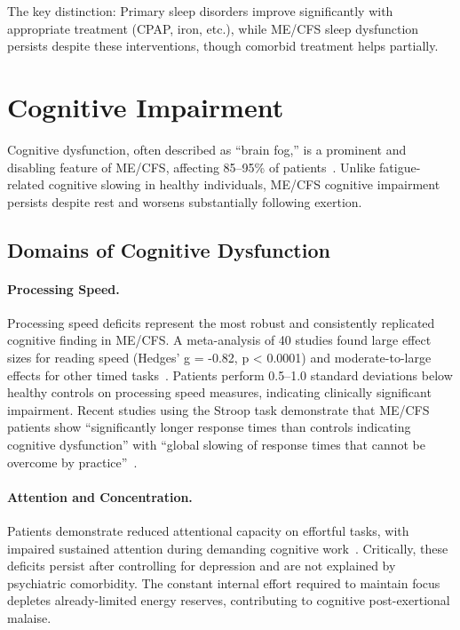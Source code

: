 The key distinction: Primary sleep disorders improve significantly with appropriate treatment (CPAP, iron, etc.), while ME/CFS sleep dysfunction persists despite these interventions, though comorbid treatment helps partially.

\section{Cognitive Impairment}
\label{sec:cognitive}

Cognitive dysfunction, often described as ``brain fog,'' is a prominent and disabling feature of ME/CFS, affecting 85--95\% of patients~\cite{Cvejic2022cognitive}. Unlike fatigue-related cognitive slowing in healthy individuals, ME/CFS cognitive impairment persists despite rest and worsens substantially following exertion.

\subsection{Domains of Cognitive Dysfunction}
\label{subsec:cognitive-domains}

\paragraph{Processing Speed.}
Processing speed deficits represent the most robust and consistently replicated cognitive finding in ME/CFS. A meta-analysis of 40 studies found large effect sizes for reading speed (Hedges' g = -0.82, p < 0.0001) and moderate-to-large effects for other timed tasks~\cite{Cvejic2022cognitive}. Patients perform 0.5--1.0 standard deviations below healthy controls on processing speed measures, indicating clinically significant impairment. Recent studies using the Stroop task demonstrate that ME/CFS patients show ``significantly longer response times than controls indicating cognitive dysfunction'' with ``global slowing of response times that cannot be overcome by practice''~\cite{Thapaliya2024stroop}.

\paragraph{Attention and Concentration.}
Patients demonstrate reduced attentional capacity on effortful tasks, with impaired sustained attention during demanding cognitive work~\cite{Cvejic2022cognitive,MCAM2024cognitive}. Critically, these deficits persist after controlling for depression and are not explained by psychiatric comorbidity. The constant internal effort required to maintain focus depletes already-limited energy reserves, contributing to cognitive post-exertional malaise.

